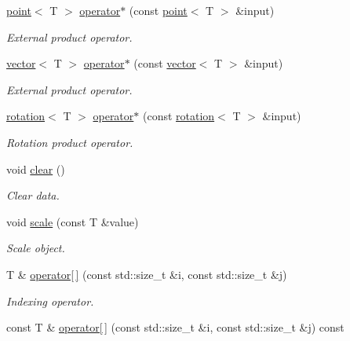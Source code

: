 \begin{DoxyCompactItemize}
\hyperlink{classddd_1_1point}{point}$<$ T $>$ \hyperlink{classddd_1_1rotation_a5761f38de833fde1a6c299ba1e1dc844}{operator$\ast$} (const \hyperlink{classddd_1_1point}{point}$<$ T $>$ \&input)
\begin{DoxyCompactList}\small\item\em External product operator. \end{DoxyCompactList}\item 
\hyperlink{classddd_1_1vector}{vector}$<$ T $>$ \hyperlink{classddd_1_1rotation_a1b55d8f810793caa469b12a2ca41ee6c}{operator$\ast$} (const \hyperlink{classddd_1_1vector}{vector}$<$ T $>$ \&input)
\begin{DoxyCompactList}\small\item\em External product operator. \end{DoxyCompactList}\item 
\hyperlink{classddd_1_1rotation}{rotation}$<$ T $>$ \hyperlink{classddd_1_1rotation_af4bae9f617bb9760fc44d5520098e2eb}{operator$\ast$} (const \hyperlink{classddd_1_1rotation}{rotation}$<$ T $>$ \&input)
\begin{DoxyCompactList}\small\item\em Rotation product operator. \end{DoxyCompactList}\item 
\mbox{\label{classddd_1_1mat_object_ad7c6aab0d8d7f5a2b6c522175aa35fc0}} 
void \hyperlink{classddd_1_1mat_object_ad7c6aab0d8d7f5a2b6c522175aa35fc0}{clear} ()
\begin{DoxyCompactList}\small\item\em Clear data. \end{DoxyCompactList}\item 
void \hyperlink{classddd_1_1mat_object_a078f66a56b01fc18cc9864ec736611e5}{scale} (const T \&value)
\begin{DoxyCompactList}\small\item\em Scale object. \end{DoxyCompactList}\item 
T \& \hyperlink{classddd_1_1mat_object_a361b78105da1bb2151f51f674a20d59a}{operator\mbox{[}$\,$\mbox{]}} (const std\+::size\+\_\+t \&i, const std\+::size\+\_\+t \&j)
\begin{DoxyCompactList}\small\item\em Indexing operator. \end{DoxyCompactList}\item 
const T \& \hyperlink{classddd_1_1mat_object_ae87764e4910b1323233f611c796946a2}{operator\mbox{[}$\,$\mbox{]}} (const std\+::size\+\_\+t \&i, const std\+::size\+\_\+t \&j) const

\end{DoxyCompactItemize}
